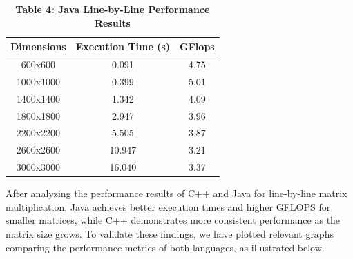 \documentclass{article}
\begin{document}
\begin{table}[H]
\centering
\caption*{\textbf{ Table 4: Java Line-by-Line Performance Results}}
\begin{tabular}{||c | c | c||} 
 \hline
 \textbf{Dimensions} & \textbf{Execution Time (s)} & \textbf{GFlops} \\  
 \hline \hline
 600x600  & 0.091   & 4.75   \\  
 \hline
 1000x1000 & 0.399   & 5.01   \\  
 \hline
 1400x1400 & 1.342   & 4.09   \\  
 \hline
 1800x1800 & 2.947   & 3.96   \\  
 \hline
 2200x2200 & 5.505   & 3.87   \\  
 \hline
 2600x2600 & 10.947  & 3.21   \\  
 \hline
 3000x3000 & 16.040  & 3.37   \\  
 \hline
\end{tabular}
\end{table}

After analyzing the performance results of C++ and Java for line-by-line matrix multiplication, Java achieves better execution times and higher GFLOPS for smaller matrices, while C++ demonstrates more consistent performance as the matrix size grows. To validate these findings, we have plotted relevant graphs comparing the performance metrics of both languages, as illustrated below.
\end{document}
